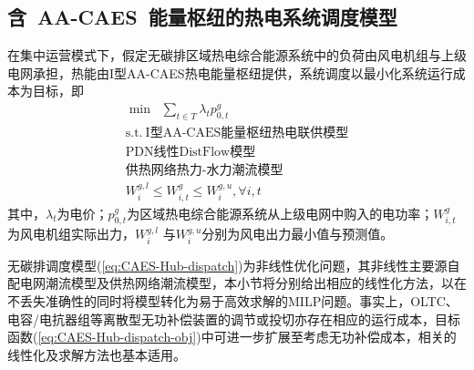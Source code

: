 \subsection{含~AA-CAES~能量枢纽的热电系统调度模型}

在集中运营模式下，假定无碳排区域热电综合能源系统中的负荷由风电机组与上级电网承担，热能由I型AA-CAES热电能量枢纽提供，系统调度以最小化系统运行成本为目标，即
\begin{subequations}
\label{eq:CAES-Hub-dispatch}
\begin{gather}
\min \;\;\sum\limits_{t \in T} {{\lambda_t}{p_{0,t}^g}} \label{eq:CAES-Hub-dispatch-obj}\\
\mbox{s.t.}~
\mbox{I型AA-CAES能量枢纽热电联供模型}\\
\mbox{PDN线性DistFlow模型}\\
\mbox{供热网络热力-水力潮流模型} \\
W_i^{g,l} \le W_{i,t}^g \le W_i^{g,u},\forall i,t
\end{gather}
\end{subequations}
其中，${\lambda_t}$为电价；${p_{0,t}^g}$为区域热电综合能源系统从上级电网中购入的电功率；$W_{i,t}^g$为风电机组实际出力，$W_i^{g,l}$ 与$W_i^{g,u}$分别为风电出力最小值与预测值。

无碳排调度模型(\ref{eq:CAES-Hub-dispatch})为非线性优化问题，其非线性主要源自配电网潮流模型及供热网络潮流模型，本小节将分别给出相应的线性化方法，以在不丢失准确性的同时将模型转化为易于高效求解的MILP问题。事实上，OLTC、电容/电抗器组等离散型无功补偿装置的调节或投切亦存在相应的运行成本，目标函数(\ref{eq:CAES-Hub-dispatch-obj})中可进一步扩展至考虑无功补偿成本，相关的线性化及求解方法也基本适用。

